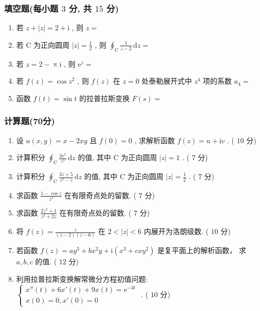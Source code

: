 \documentclass[cn,11pt,fancy,hide]{elegantbook}
\newcommand{\ee}{\mathrm{e}}
\newcommand{\dd}{\,\mathrm{d}}
\newcommand{\ii}{\mathrm{i}}
\begin{document}
\subsubsection{填空题(每小题 $3$ 分, 共 $15$ 分)}
\begin{enumerate}
	\item 若 $z+|z|=2+\ii$ , 则 $z=$\underline{\hspace{8pc}}
	
	\item 若 $\mathrm{C}$ 为正向圆周 $|z|=\frac{1}{2}$ , 则 $\oint_{\mathrm{C}} \frac{1}{z-2} \dd z=$\underline{\hspace{8pc}}
	
	\item 若 $z=2-\uppi\ii$ , 则 $\ee^{z}=$\underline{\hspace{8pc}}
	
	\item 若 $f(z)=\cos z^2$ , 则 $f(z)$ 在 $z=0$ 处泰勒展开式中 $z^4$ 项的系数 $a_4=$\underline{\hspace{8pc}}
	
	\item 函数 $f(t)=\sin t$ 的拉普拉斯变换 $F(s)=$\underline{\hspace{8pc}}
\end{enumerate}

\subsubsection{计算题(70分)}
\begin{enumerate}
	\item 设 $u(x,y)=x-2xy$ 且 $f(0)=0$ , 求解析函数 $f(z)=u+\ii v$ . ( $10$ 分)
	
	\item 计算积分 $\oint_{\mathrm{C}}\frac{2\ee^x}{z^5}\dd z$ 的值, 其中 $\mathrm{C}$ 为正向圆周 $|z|=1$ . ( $7$ 分)
	
	\item 计算积分 $\oint_{\mathrm{C}}\frac{3z+5}{z^2-z}\dd z$ 的值, 其中 $\mathrm{C}$ 为正向圆周 $|z|=\frac{1}{2}$ . ( $7$ 分)
	
	\item 求函数 $\frac{1-\cos z}{z^3}$ 在有限奇点处的留数. ( $7$ 分)
	
	\item 求函数 $\frac{2z^2+1}{z^2+2z}$ 在有限奇点处的留数. ( $7$ 分)
	
	\item 将 $f(z)=\frac{z}{(z-2)(z-6)}$ 在 $2<|z|<6$ 内展开为洛朗级数. ( $10$ 分)
	
	\item 若函数 $f(z)=a y^{3}+b x^{2} y+\ii\left(x^{3}+c x y^{2}\right)$ 是复平面上的解析函数， 求 $a,b,c$ 的值. ( $12$ 分)
	
	\item 利用拉普拉斯变换解常微分方程初值问题: $\begin{cases}
	x''(t)+6x'(t)+9x(t)=\ee^{-3t}\\
	x(0)=0, x'(0)=0
	\end{cases}$ . ( $10$ 分)
\end{enumerate}
\end{document}
